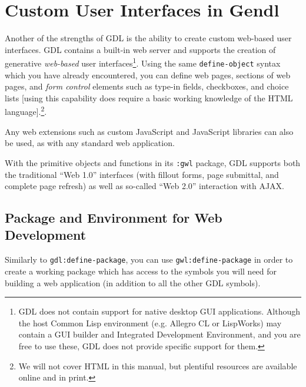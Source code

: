 \documentclass [11pt]{book}
\begin{document}
\chapter{Custom User Interfaces in Gendl}

\label{chap:customuserinterfacesingendl}



Another of the strengths of GDL is the ability to create custom
web-based user interfaces. GDL contains a built-in web server and
supports the creation of generative \emph{web-based} user interfaces\footnote{GDL does not contain support for native desktop
GUI applications. Although the host Common Lisp
environment (e.g. Allegro CL or LispWorks) may contain a GUI builder
and Integrated Development Environment, and you are free to use these,
GDL does not provide specific support for them.}. Using the same \texttt{define-object} syntax which you have already encountered, you can define
web pages, sections of web pages, and \emph{form control} elements such as type-in fields, checkboxes, and choice
lists [using this capability does require a basic working knowledge of
the HTML language].\footnote{We will not cover HTML in this manual, but
plentiful resources are available online and in print.}.



Any web extensions such as custom JavaScript and JavaScript libraries
can also be used, as with any standard web application.



With the primitive objects and functions in its \texttt{:gwl} package, GDL supports both the traditional ``Web 1.0''
interfaces (with fillout forms, page submittal, and complete page
refresh) as well as so-called ``Web 2.0'' interaction with AJAX.



\section{Package and Environment for Web Development}

\label{sec:packageandenvironmentforwebdevelopment}



Similarly to \texttt{gdl:define-package}, you can use \texttt{gwl:define-package} in order to create a working package which has
access to the symbols you will need for building a web application (in
addition to all the other GDL symbols).
\end{document}
